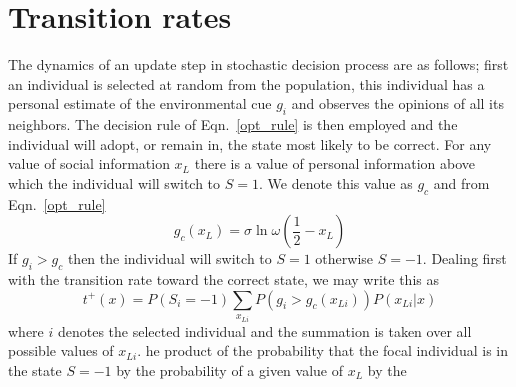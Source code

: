 \documentclass[3p,number,sort&compress,times]{elsarticle}
\begin{document}
\section{Transition rates}
The dynamics of an update step in stochastic decision process are as follows; first an individual is selected at random from the population, this individual has a personal estimate of the environmental cue $g_i$ and observes the opinions of all its neighbors. The decision rule of Eqn.~\ref{opt_rule} is then employed and the individual will adopt, or remain in, the state most likely to be correct.
For any value of social information $x_L$ there is a value of personal information above which the individual will switch to $S=1$. We denote this value as $g_c$ and from Eqn.~\ref{opt_rule} 
\begin{equation}
g_c(x_L) = \sigma\ln\omega  \left(\frac{1}{2}-x_L\right) 
\end{equation}
If $g_i>g_c$ then the individual will switch to $S=1$ otherwise $S=-1$. 
Dealing first with the transition rate toward the correct state, we may write this as
\begin{equation}
t^+(x) = P(S_i=-1)\sum_{x_{Li}}P\left(g_i>g_c(x_{Li})\right)P\left(x_{Li}|x\right)
\end{equation}
where $i$ denotes the selected individual and the summation is taken over all possible values of $x_{Li}$.
he product of the probability that the focal individual is in the state $S=-1$ by the probability of a given value of $x_L$ by the 


%
%
%

\end{document}
